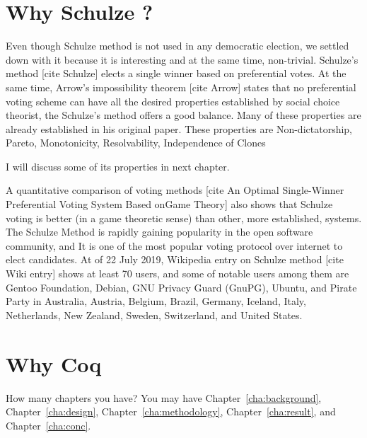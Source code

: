 \section{Why Schulze ?}
\label{sec:thesisstatement}
Even though Schulze method is not used in any democratic election, we settled down 
with it because it is interesting  and at the same time, non-trivial. 
 Schulze's method [cite Schulze]  elects  a single winner based on 
preferential votes.  At the same time, Arrow's impossibility theorem [cite Arrow]  states that no preferential voting 
scheme can have all the desired properties established by  social choice theorist,
the Schulze's method offers a good balance. Many of these properties are already 
established in his original paper. These properties are Non-dictatorship,  Pareto,  Monotonicity, 
Resolvability, Independence of Clones 

I will discuss some of its properties in next chapter. 


A  quantitative  comparison of voting methods 
[cite An Optimal Single-Winner Preferential Voting System Based onGame Theory]  also shows that 
Schulze voting is better (in a game theoretic sense) than other, more established, systems.  The 
Schulze Method is rapidly gaining popularity in the open software community, and It is one of the most 
popular voting protocol over internet to elect candidates. At of 22 July 2019, Wikipedia entry on Schulze 
method [cite Wiki entry] shows at least 70 users, and some of 
notable users among them are Gentoo Foundation, Debian, GNU Privacy Guard (GnuPG), Ubuntu, and 
Pirate Party in Australia, Austria, Belgium, Brazil, Germany, Iceland, Italy, 
Netherlands, New Zealand, Sweden, Switzerland, and United States.  






\section{Why Coq}
\label{sec:outline}
How many chapters you have? You may have Chapter~\ref{cha:background},
Chapter~\ref{cha:design}, Chapter~\ref{cha:methodology},
Chapter~\ref{cha:result}, and Chapter~\ref{cha:conc}.
